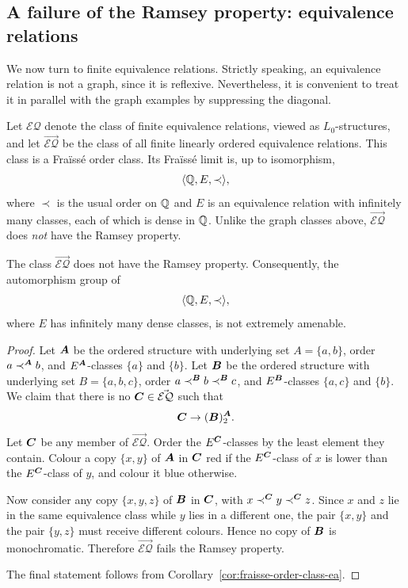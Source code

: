 \subsection{A failure of the Ramsey property: equivalence relations}

We now turn to finite equivalence relations. Strictly speaking, an equivalence relation is not a graph, since it is reflexive. Nevertheless, it is convenient to treat it in parallel with the graph examples by suppressing the diagonal.

Let \(\mathcal{EQ}\) denote the class of finite equivalence relations, viewed as \(L_0\)-structures, and let \(\vec{\mathcal{EQ}}\) be the class of all finite linearly ordered equivalence relations. This class is a Fraïssé order class. Its Fraïssé limit is, up to isomorphism,
\[
    \langle \mathbb{Q},E,\prec\rangle,
\]
where \(\prec\) is the usual order on \(\mathbb{Q}\) and \(E\) is an equivalence relation with infinitely many classes, each of which is dense in \(\mathbb{Q}\). Unlike the graph classes above, \(\vec{\mathcal{EQ}}\) does \emph{not} have the Ramsey property.

\begin{theorem}
    \label{thm:eq-not-ramsey}
    The class \(\vec{\mathcal{EQ}}\) does not have the Ramsey property. Consequently, the automorphism group of
    \[
        \langle \mathbb{Q},E,\prec\rangle,
    \]
    where \(E\) has infinitely many dense classes, is not extremely amenable.
\end{theorem}

\begin{proof}
    Let \(\boldsymbol{A}\) be the ordered structure with underlying set \(A=\{a,b\}\), order \(a\prec^{\boldsymbol{A}} b\), and \(E^{\boldsymbol{A}}\)-classes \(\{a\}\) and \(\{b\}\). Let \(\boldsymbol{B}\) be the ordered structure with underlying set \(B=\{a,b,c\}\), order \(a\prec^{\boldsymbol{B}} b\prec^{\boldsymbol{B}} c\), and \(E^{\boldsymbol{B}}\)-classes \(\{a,c\}\) and \(\{b\}\). We claim that there is no \(\boldsymbol{C}\in \vec{\mathcal{EQ}}\) such that
    \[
        \boldsymbol{C}\to (\boldsymbol{B})^{\boldsymbol{A}}_2.
    \]
    Let \(\boldsymbol{C}\) be any member of \(\vec{\mathcal{EQ}}\). Order the \(E^{\boldsymbol{C}}\)-classes by the least element they contain. Colour a copy \(\{x,y\}\) of \(\boldsymbol{A}\) in \(\boldsymbol{C}\) red if the \(E^{\boldsymbol{C}}\)-class of \(x\) is lower than the \(E^{\boldsymbol{C}}\)-class of \(y\), and colour it blue otherwise.

    Now consider any copy \(\{x,y,z\}\) of \(\boldsymbol{B}\) in \(\boldsymbol{C}\), with \(x\prec^{\boldsymbol{C}} y\prec^{\boldsymbol{C}} z\).
    Since \(x\) and \(z\) lie in the same equivalence class while \(y\) lies in a different one, the pair \(\{x,y\}\) and the pair \(\{y,z\}\) must receive different colours. Hence no copy of \(\boldsymbol{B}\) is monochromatic. Therefore \(\vec{\mathcal{EQ}}\) fails the Ramsey property.

    The final statement follows from Corollary~\ref{cor:fraisse-order-class-ea}.
\end{proof}

